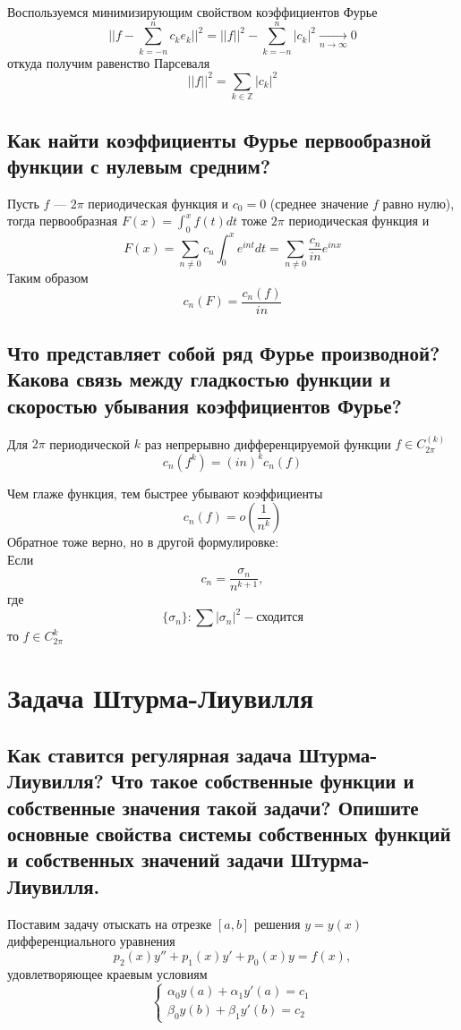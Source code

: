 \documentclass{article}
\begin{document}
Воспользуемся минимизирующим свойством коэффициентов Фурье 
\[ ||f-\sum_{k=-n}^{n} c_k e_k||^2 = 
||f||^2 - \sum_{k=-n}^{n}|c_k|^2 \underset{n \rightarrow \infty}{\longrightarrow} 0\]
откуда получим равенство Парсеваля
\[ ||f||^2 = \sum_{k \in \mathbb{Z}} |c_k|^2 \]



\subsection{Как найти коэффициенты Фурье первообразной функции с нулевым средним?}
Пусть $ f $ ---  $ 2\pi $ периодическая функция и $ c_0 = 0 $ (среднее значение $f$ равно нулю), тогда первообразная $ F(x) = \int_{0}^{x}f(t)dt $ тоже $ 2\pi $ периодическая функция и 
\[ F(x) = \sum_{n \neq 0}c_n \int_{0}^{x} e^{int}dt = \sum_{n \neq 0} \frac{c_n}{in} e^{inx}\]
Таким образом 
\[ c_n(F)=\frac{c_n(f)}{in} \]



\subsection{Что представляет собой ряд Фурье производной? Какова связь между гладкостью функции и скоростью убывания коэффициентов Фурье?}
Для $ 2\pi $ периодической $ k $ раз непрерывно дифференцируемой функции $ f \in C_{2\pi}^{(k)} $
\[ c_n(f^{k}) = (in)^k c_n(f)  \]

Чем глаже функция, тем быстрее убывают коэффициенты 
\[ c_n(f) = o\left(\frac{1}{n^k}\right)\]
Обратное тоже верно, но в другой формулировке:\\
Если
\[ c_n = \frac{\sigma_n}{n^{k+1}}, \]
где \[ \{\sigma_n\}: \sum |\sigma_n|^2 - \text{сходится}  \]
то $f \in C_{2\pi}^k$



\section{Задача Штурма-Лиувилля}


\subsection{Как ставится регулярная задача Штурма-Лиувилля? Что такое собственные функции и собственные значения такой задачи? Опишите основные свойства системы собственных функций и собственных значений задачи Штурма-Лиувилля.}
Поставим задачу отыскать на отрезке $ [a, b] $ решения $ y = y(x)$ дифференциального уравнения 
\[ p_2(x)y'' + p_1(x)y' + p_0(x)y = f(x), \]
удовлетворяющее краевым условиям 
\[ \left\{\begin{matrix}
	\alpha_0 y(a) + \alpha_1 y'(a) = c_1\\ 
	\beta_0 y(b) + \beta_1 y'(b) = c_2
\end{matrix}\right. \]
\end{document}
